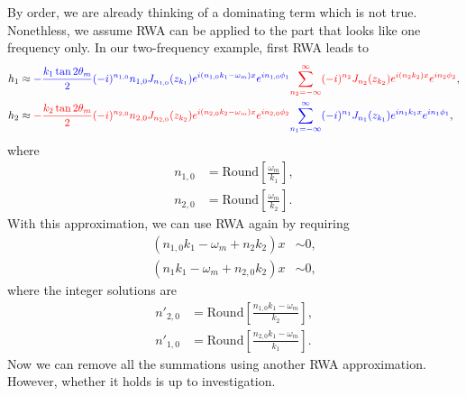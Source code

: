 \documentclass[letterpaper,12pt,english]{sphinxmanual}
\begin{document}
By order, we are already thinking of a dominating term which is not true. Nonethless, we assume RWA can be applied to the part that looks like one frequency only. In our two-frequency example, first RWA leads to
\label{\detokenize{matter-stimulated/two-frequency:equation-eqn-after-first-rwa}}\begin{equation}\label{equation:matter-stimulated/two-frequency:eqn-after-first-rwa}
\begin{split}h_1 & \approx {\color{blue}-\frac{k_1 \tan 2\theta_m}{2} (-i)^{n_{1,0}} n_{1,0} J_{n_{1,0}} (z_{k_1}) e^{i (n_{1,0} k_1-\omega_m)x} e^{i n_{1,0}\phi_1} } {\color{red} \sum_{n_2=-\infty}^{\infty} (-i)^{n_2} J_{n_2}(z_{k_2}) e^{i(n_2k_2)x} e^{i n_2 \phi_2}  }, \\
h_2 & \approx {\color{red} - \frac{k_2\tan 2\theta_m}{2} (-i)^{n_{2,0}} n_{2,0} J_{n_{2,0}}(z_{k_2}) e^{i(n_{2,0}k_2-\omega_m)x} e^{i n_{2,0} \phi_2}  }{\color{blue} \sum_{n_1=-\infty}^{\infty} (-i)^{n_1} J_{n_1}(z_{k_1}) e^{in_1 k_1 x} e^{i n_1 \phi_1} },\end{split}
\end{equation}
where
\begin{equation*}
\begin{split}n_{1,0} &= \mathrm{Round}\left[  \frac{\omega_m}{k_1}  \right], \\
n_{2,0} &= \mathrm{Round}\left[  \frac{\omega_m}{k_2}  \right] .\end{split}
\end{equation*}
With this approximation, we can use RWA again by requiring
\begin{equation*}
\begin{split}(n_{1,0} k_1-\omega_m + n_2 k_2)x &\sim 0, \\
(n_1 k_1-\omega_m + n_{2,0} k_2)x &\sim 0,\end{split}
\end{equation*}
where the integer solutions are
\begin{equation*}
\begin{split}n'_{2,0} &= \mathrm{Round}\left[ \frac{ n_{1,0} k_1-\omega_m }{k_2} \right], \\
n'_{1,0} &= \mathrm{Round}\left[ \frac{ n_{2,0} k_1-\omega_m }{k_1} \right].\end{split}
\end{equation*}
Now we can remove all the summations using another RWA approximation. However, whether it holds is up to investigation.
\end{document}
